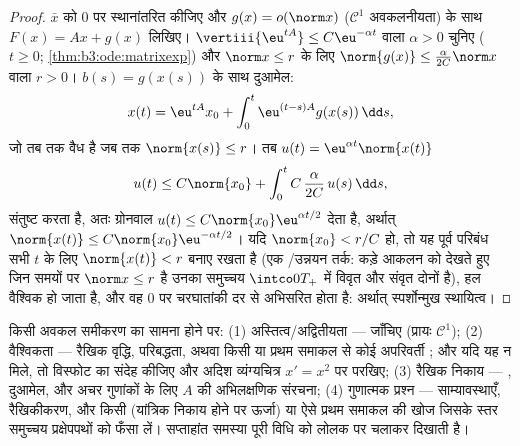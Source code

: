 \begin{proof}
$\bar x$ को $0$ पर स्थानांतरित कीजिए और $g(x) = o(\norm x)$ ($\mathcal C^1$ अवकलनीयता) के
साथ $F(x) = Ax + g(x)$ लिखिए। $\vertiii{\eu^{tA}} \leq C\eu^{-\alpha t}$ वाला $\alpha > 0$ चुनिए ($t \geq 0$; \cref{thm:b3:ode:matrixexp}) और $\norm x \leq
r$
के लिए $\norm{g(x)} \leq \frac{\alpha}{2C}\norm x$ वाला $r > 0$। $b(s) = g(x(s))$ के साथ दुआमेल:
\[
x(t) = \eu^{tA}x_0 + \int_0^t\eu^{(t-s)A}g(x(s))\,\dd s,
\]
जो तब तक वैध है जब तक $\norm{x(s)} \leq r$। तब $u(t) =
\eu^{\alpha t}\norm{x(t)}$
\[
u(t) \leq C\norm{x_0} +
\int_0^{t}C\,\frac{\alpha}{2C}\,u(s)\,\dd s ,
\]
संतुष्ट करता है, अतः ग्रोनवाल $u(t) \leq C\norm{x_0}\eu^{\alpha t/2}$ देता है, अर्थात् $\norm{x(t)} \leq C\norm{x_0}\eu^{-\alpha t/2}$। यदि
$\norm{x_0} < r/C$ हो, तो यह पूर्व परिबंध सभी $t$ के लिए $\norm{x(t)} <
r$ बनाए रखता है
(एक /उन्नयन तर्क: कड़े आकलन को देखते हुए जिन समयों पर
$\norm x \leq r$ है उनका समुच्चय $\intco0{T_+}$ में विवृत और संवृत दोनों है), हल
वैश्विक हो जाता है, और वह $0$ पर चरघातांकी दर से अभिसरित होता
है: अर्थात् स्पर्शोन्मुख स्थायित्व।
\end{proof}

\begin{method}\label{met:b3:ode:strategy}
किसी अवकल समीकरण का सामना होने पर: (1) अस्तित्व/अद्वितीयता ---
 जाँचिए (प्रायः $\mathcal C^1$); (2) वैश्विकता ---
रैखिक वृद्धि, परिबद्धता, अथवा किसी  या प्रथम समाकल
से कोई अपरिवर्ती ; और यदि यह न मिले, तो विस्फोट का संदेह
कीजिए और अदिश व्यंग्यचित्र $x' = x^2$ पर परखिए; (3) रैखिक निकाय ---
, दुआमेल, और अचर गुणांकों के लिए $A$ की अभिलक्षणिक
संरचना; (4) गुणात्मक प्रश्न --- साम्यावस्थाएँ, रैखिकीकरण, और
किसी  (यांत्रिक निकाय होने पर ऊर्जा) या ऐसे प्रथम
समाकल की खोज जिसके स्तर समुच्चय प्रक्षेपपथों को फँसा लें।
सप्ताहांत समस्या पूरी विधि को लोलक पर चलाकर दिखाती है।
\end{method}


